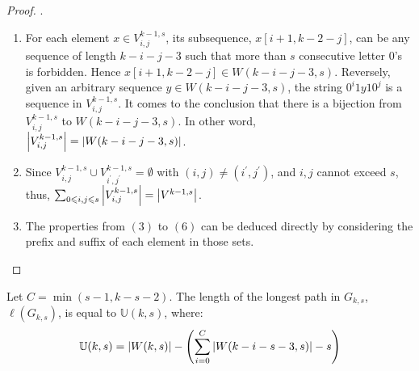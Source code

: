 \begin{proof}
    {\color{white}.}
    
    \begin{enumerate}
        \item For each element $x\in V^{k-1,s}_{i,j}$, its subsequence, $x[i+1,k-2-j]$, can be any sequence of length $k-i-j-3$ such that more than $s$ consecutive letter $0$'s is forbidden. Hence $x[i+1,k-2-j]\in W(k-i-j-3,s)$. Reversely, given an arbitrary sequence $y\in W(k-i-j-3,s)$, the string $0^{i}1y10^{j}$ is a sequence in $V^{k-1,s}_{i,j}$. It comes to the conclusion that there is a bijection from $V^{k-1,s}_{i,j}$ to $W(k-i-j-3,s)$. In other word, $\left \lvert  V^{k-1,s}_{i,j} \right \rvert = \left \lvert  W(k-i-j-3,s) \right \rvert $.
        
        \item Since $V^{k-1,s}_{i,j}\cup V^{k-1,s}_{i^{\prime},j^{\prime}} = \emptyset$ with $(i,j)\neq(i^{\prime},j^{\prime})$, and $i,j$ cannot exceed $s$, thus, $\sum_{0\leqslant i,j\leqslant s}\left \lvert  V^{k-1,s}_{i,j} \right \rvert = \left \lvert  V^{k-1,s} \right \rvert$.
        
        \item The properties from $(3)$ to $(6)$ can be deduced directly by considering the prefix and suffix of each element in those sets.
    \end{enumerate}
\end{proof}




\begin{theorem}\label{theo:maximal_length}
    Let $C=\min{(s-1,k-s-2)}$. The length of the longest path in $G_{k,s}$, $\ell(G_{k,s})$, is equal to $\mathbb{U}(k,s)$, where:
    \begin{align}
        \mathbb{U}(k,s) = \left \lvert  W(k,s) \right \rvert - \left(\sum_{i=0}^{C}\left \lvert  W(k-i-s-3,s) \right \rvert - s\right)
    \end{align}
\end{theorem}


